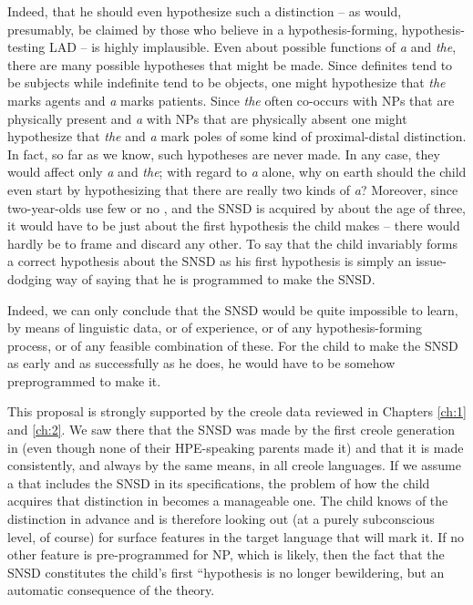 Indeed, that he should even hypothesize such a distinction -- as would, presumably, be claimed by those who believe in a hypothesis-forming, hypothesis-testing LAD -- is highly implausible. Even about possible functions of \textit{a} and \textit{the}, there are many possible hypotheses that might be made. Since definites tend to be subjects while indefinite tend to be objects, one might hypothesize that \textit{the} marks agents and
\textit{a} marks patients. Since \textit{the} often co-occurs with NPs that are physically present and \textit{a} with NPs that are physically absent one might hypothesize that \textit{the} and \textit{a} mark poles of some kind of proximal-distal distinction. In fact, so far as we know, such hypotheses are never made. In any case, they would affect only \textit{a} and \textit{the}; with regard to \textit{a} alone, why on earth should the child even start by hypothesizing that there are really two kinds of \textit{a}? Moreover, since two-year-olds use few or no , and the SNSD is acquired by about the age of three, it would have to be just about the first hypothesis the child makes -- there would hardly be  to frame and discard any other. To say that the child invariably forms a correct hypothesis about the SNSD as his first hypothesis is simply an issue-dodging way of saying that he is programmed to make the SNSD.

Indeed, we can only conclude that the SNSD would be quite impossible to learn, by means of linguistic data, or of experience, or of any hypothesis-forming process, or of any feasible combination of these. For the child to make the SNSD as early and as successfully as he does, he would have to be somehow preprogrammed to make it.

This proposal is strongly supported by the creole data reviewed in Chapters \ref{ch:1} and \ref{ch:2}. We saw there that the SNSD was made by the first creole generation in  (even though none of their HPE-speaking parents made it) and that it is made consistently, and always by the same means, in all creole languages. If we assume a  that includes the SNSD in its specifications, the problem of how the child acquires that distinction in  becomes a manageable one. The child knows of the distinction in advance and is therefore looking out (at a purely subconscious level, of course) for surface features in the target language that will mark it. If no other feature is pre-programmed for NP, which is likely, then the fact that the SNSD constitutes the child's first ``hypothesis is no longer bewildering, but an automatic consequence of the theory.

